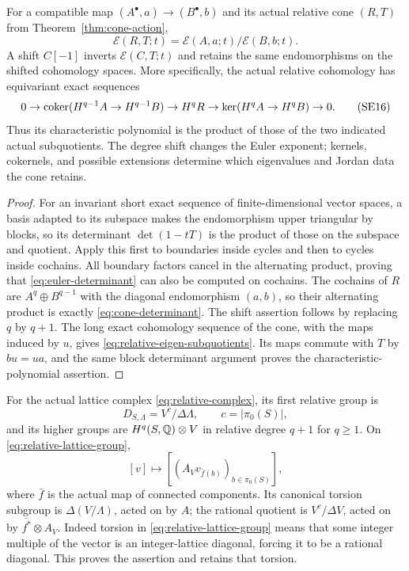 \begin{proposition}
\label{prop:cone-determinant}
For a compatible map $(A^\bullet,a)\to(B^\bullet,b)$ and its actual
relative cone $(R,T)$ from Theorem~\ref{thm:cone-action},
\[
 \mathcal E(R,T;t)=\mathcal E(A,a;t)/\mathcal E(B,b;t).
 \tag{SE15}\label{eq:cone-determinant}
\]
A shift $C[-1]$ inverts $\mathcal E(C,T;t)$ and retains the same
endomorphisms on the shifted cohomology spaces. More specifically,
the actual relative cohomology has equivariant exact sequences
\[
 0\to\operatorname{coker}(H^{q-1}A\to H^{q-1}B)\to H^qR
   \to\ker(H^qA\to H^qB)\to0.
 \tag{SE16}\label{eq:relative-eigen-subquotients}
\]
Thus its characteristic polynomial is the product of those of the
two indicated actual subquotients. The degree shift changes the
Euler exponent; kernels, cokernels, and possible extensions determine
which eigenvalues and Jordan data the cone retains.
\end{proposition}
\begin{proof}
For an invariant short exact sequence of finite-dimensional vector
spaces, a basis adapted to its subspace makes the endomorphism
upper triangular by blocks, so its determinant $\det(1-tT)$ is the
product of those on the subspace and quotient. Apply this first to
boundaries inside cycles and then to cycles inside cochains. All
boundary factors cancel in the alternating product, proving that
\eqref{eq:euler-determinant} can also be computed on cochains.
The cochains of $R$ are $A^q\oplus B^{q-1}$ with the diagonal
endomorphism $(a,b)$, so their alternating product is exactly
\eqref{eq:cone-determinant}. The shift assertion follows by replacing
$q$ by $q+1$. The long exact cohomology sequence of the cone, with
the maps induced by $u$, gives \eqref{eq:relative-eigen-subquotients}.
Its maps commute with $T$ by $bu=ua$, and the same block determinant
argument proves the characteristic-polynomial assertion.
\end{proof}

For the actual lattice complex \eqref{eq:relative-complex}, its first
relative group is
\[
 D_{S,\Lambda}=V^c/\Delta\Lambda,
 \qquad c=|\pi_0(S)|,
 \tag{SE17}\label{eq:relative-lattice-group}
\]
and its higher groups are $H^q(S,\mathbb Q)\otimes V$ in relative degree
$q+1$ for $q\ge1$. On \eqref{eq:relative-lattice-group},
\[
 [v]\longmapsto[(A_Vv_{\bar f(b)})_{b\in\pi_0(S)}],
 \tag{SE18}\label{eq:relative-lattice-action}
\]
where $\bar f$ is the actual map of connected components. Its
canonical torsion subgroup is $\Delta(V/\Lambda)$, acted on by $A$;
the rational quotient is $V^c/\Delta V$, acted on by
$\overline{f^*}\otimes A_V$. Indeed torsion in
\eqref{eq:relative-lattice-group} means that some integer multiple
of the vector is an integer-lattice diagonal, forcing it to be a
rational diagonal. This proves the assertion and retains that torsion.

